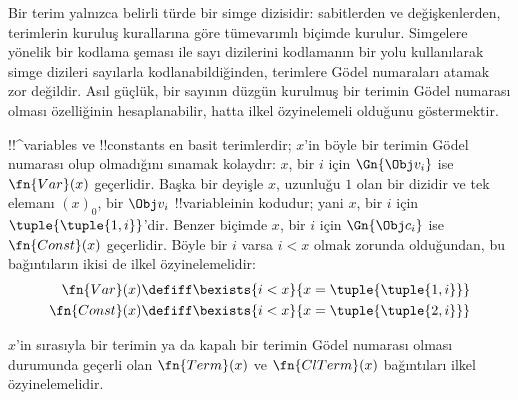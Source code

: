 \documentclass[../../../include/open-logic-section]{subfiles}
\begin{document}

\begin{explain}
Bir terim yalnızca belirli türde bir simge dizisidir: sabitlerden ve
değişkenlerden, terimlerin kuruluş kurallarına göre tümevarımlı biçimde
kurulur. Simgelere yönelik bir kodlama şeması ile sayı dizilerini kodlamanın
bir yolu kullanılarak simge dizileri sayılarla kodlanabildiğinden, terimlere
Gödel numaraları atamak zor değildir. Asıl güçlük, bir sayının düzgün
kurulmuş bir terimin Gödel numarası olması özelliğinin hesaplanabilir, hatta
ilkel özyinelemeli olduğunu göstermektir.
\end{explain}

!!^{variable}s ve !!{constant}s en basit terimlerdir; $x$'in böyle bir
terimin Gödel numarası olup olmadığını sınamak kolaydır: $x$, bir $i$ için
$\Gn{\Obj v_i}$ ise $\fn{Var}(x)$ geçerlidir. Başka bir deyişle $x$,
uzunluğu $1$ olan bir dizidir ve tek elemanı $(x)_0$, bir $\Obj v_i$
!!{variable}{}inin kodudur; yani $x$, bir $i$ için
$\tuple{\tuple{1, i}}$'dir. Benzer biçimde $x$, bir $i$ için
$\Gn{\Obj c_i}$ ise $\fn{Const}(x)$ geçerlidir. Böyle bir $i$ varsa
$i<x$ olmak zorunda olduğundan, bu bağıntıların ikisi de ilkel
özyinelemelidir:
\begin{align*}
  \fn{Var}(x) & \defiff \bexists{i<x}{x = \tuple{\tuple{1, i}}}\\
  \fn{Const}(x) & \defiff \bexists{i<x}{x = \tuple{\tuple{2, i}}}
\end{align*}

\begin{prop}
$x$'in sırasıyla bir terimin ya da kapalı bir terimin Gödel numarası olması
durumunda geçerli olan $\fn{Term}(x)$ ve $\fn{ClTerm}(x)$ bağıntıları ilkel
özyinelemelidir.
\end{prop}
\end{document}
